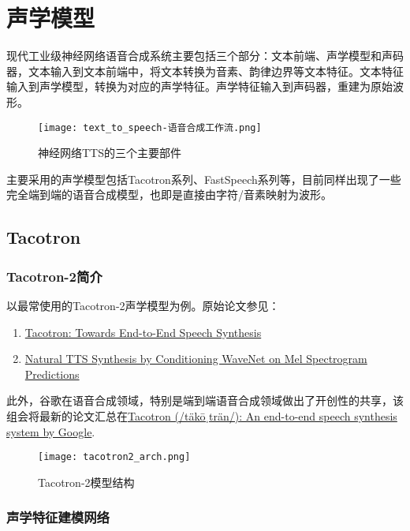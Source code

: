 \documentclass[cn,10pt,math=newtx,citestyle=gb7714-2015,bibstyle=gb7714-2015]{elegantbook}
\begin{document}
\chapter{声学模型}

现代工业级神经网络语音合成系统主要包括三个部分：文本前端、声学模型和声码器，文本输入到文本前端中，将文本转换为音素、韵律边界等文本特征。文本特征输入到声学模型，转换为对应的声学特征。声学特征输入到声码器，重建为原始波形。

\begin{figure}[htbp]
  \centering
  \texttt{[image: text\_to\_speech-语音合成工作流.png]}
  \caption{神经网络TTS的三个主要部件 \label{fig:main_components_in_tts}}
\end{figure}

主要采用的声学模型包括Tacotron系列、FastSpeech系列等，目前同样出现了一些完全端到端的语音合成模型，也即是直接由字符/音素映射为波形。

\section{Tacotron}

\subsection{Tacotron-2简介}

以最常使用的Tacotron-2声学模型为例。原始论文参见：

\begin{enumerate}
  \item \href{https://arxiv.org/abs/1703.10135}{Tacotron: Towards End-to-End Speech Synthesis}
  \item \href{https://arxiv.org/abs/1712.05884}{Natural TTS Synthesis by Conditioning WaveNet on Mel Spectrogram Predictions}
\end{enumerate}

此外，谷歌在语音合成领域，特别是端到端语音合成领域做出了开创性的共享，该组会将最新的论文汇总在\href{https://google.github.io/tacotron/}{Tacotron (/täkōˌträn/): An end-to-end speech synthesis system by Google}.

\begin{figure}[htbp]
  \centering
  \texttt{[image: tacotron2\_arch.png]}
  \caption{Tacotron-2模型结构 \label{fig:tacotron2_arch}}
\end{figure}

\subsection{声学特征建模网络}
\end{document}
